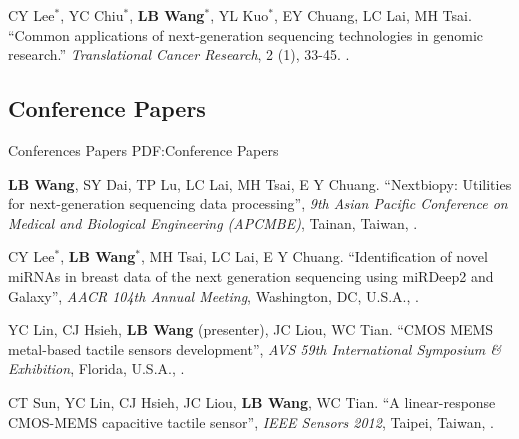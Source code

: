 \documentclass[a4paper,12pt,oneside]{article}
\begin{document}
\begin{body}
\begin{publication}[series=pub, widest*=100]
    \item
        CY Lee$^*$, YC Chiu$^*$, \textbf{LB Wang}$^*$, YL Kuo$^*$, EY  Chuang, LC Lai, MH Tsai.
        ``Common applications of next-generation sequencing technologies in genomic research.''
        \textit{Translational Cancer Research}, 2 (1), 33-45.
        .
\end{publication}

\BigEntryGap
\subsection{Conference Papers}
{Conferences Papers}
{PDF:Conference Papers}

\begin{publication}[widest*=100]  %

    \item
        \textbf{LB Wang}, SY Dai, TP Lu, LC Lai, MH Tsai, E Y Chuang.
        ``Nextbiopy: Utilities for next-generation sequencing data processing'',
        \textit{9th Asian Pacific Conference on Medical and Biological Engineering (APCMBE)},
        Tainan, Taiwan,
        .

    \item
        CY Lee$^*$, \textbf{LB Wang}$^*$, MH Tsai, LC Lai, E Y Chuang.
        ``Identification of novel miRNAs in breast data of the next generation sequencing using miRDeep2 and Galaxy'',
        \textit{AACR 104th Annual Meeting},
        Washington, DC, U.S.A.,
        .

    \item
        YC Lin, CJ Hsieh, \textbf{LB Wang} (presenter), JC Liou, WC Tian.
        ``CMOS MEMS metal-based tactile sensors development'',
        \textit{AVS 59th International Symposium \& Exhibition},
        Florida, U.S.A.,
        .

    \item
        CT Sun, YC Lin, CJ Hsieh, JC Liou, \textbf{LB Wang}, WC Tian.
        ``A linear-response CMOS-MEMS capacitive tactile sensor'',
        \textit{IEEE Sensors 2012},
        Taipei, Taiwan,
        .

\end{publication}




\end{body}
\end{document}
